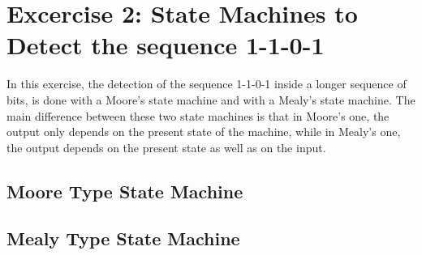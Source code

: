 
\section{\color{olive}Excercise 2: State Machines to Detect the sequence 1-1-0-1}
In this exercise, the detection of the sequence 1-1-0-1 inside a longer sequence of bits, is done with a Moore's state machine and with a Mealy's state machine. The main difference between these two state machines is that in Moore's one, the output only depends on the present state of the machine, while in Mealy's one, the output depends on the present state as well as on the input.

\subsection{\color{purple}Moore Type State Machine}




\subsection{\color{purple}Mealy Type State Machine}
